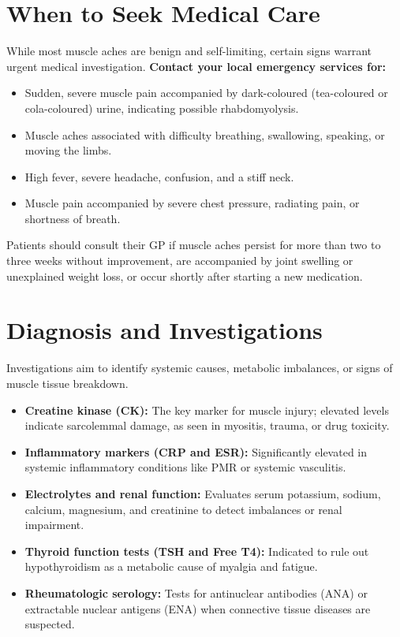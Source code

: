 \section*{When to Seek Medical Care}
While most muscle aches are benign and self-limiting, certain signs warrant urgent medical investigation.
\textbf{Contact your local emergency services for:}
\begin{itemize}
    \item Sudden, severe muscle pain accompanied by dark-coloured (tea-coloured or cola-coloured) urine, indicating possible rhabdomyolysis.
    \item Muscle aches associated with difficulty breathing, swallowing, speaking, or moving the limbs.
    \item High fever, severe headache, confusion, and a stiff neck.
    \item Muscle pain accompanied by severe chest pressure, radiating pain, or shortness of breath.
\end{itemize}
Patients should consult their GP if muscle aches persist for more than two to three weeks without improvement, are accompanied by joint swelling or unexplained weight loss, or occur shortly after starting a new medication.

\section*{Diagnosis and Investigations}
Investigations aim to identify systemic causes, metabolic imbalances, or signs of muscle tissue breakdown.
\begin{itemize}
    \item \textbf{Creatine kinase (CK):} The key marker for muscle injury; elevated levels indicate sarcolemmal damage, as seen in myositis, trauma, or drug toxicity.
    \item \textbf{Inflammatory markers (CRP and ESR):} Significantly elevated in systemic inflammatory conditions like PMR or systemic vasculitis.
    \item \textbf{Electrolytes and renal function:} Evaluates serum potassium, sodium, calcium, magnesium, and creatinine to detect imbalances or renal impairment.
    \item \textbf{Thyroid function tests (TSH and Free T4):} Indicated to rule out hypothyroidism as a metabolic cause of myalgia and fatigue.
    \item \textbf{Rheumatologic serology:} Tests for antinuclear antibodies (ANA) or extractable nuclear antigens (ENA) when connective tissue diseases are suspected.
\end{itemize}

